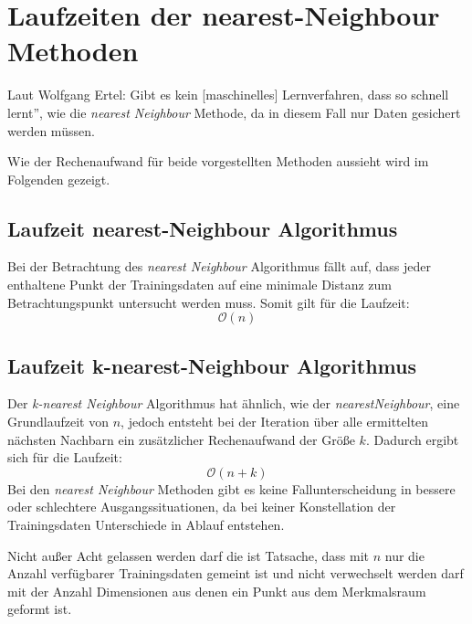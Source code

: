 \documentclass[fontsize=11pt]{scrartcl}
\begin{document}
                         
        \section{Laufzeiten der nearest-Neighbour Methoden}
        \label{sec:laufzeit}
            Laut Wolfgang Ertel: \glqq Gibt es kein [maschinelles] Lernverfahren, dass so schnell lernt”\cite{ertel2016_p213}, wie die \emph{nearest Neighbour} Methode, da in diesem Fall nur Daten gesichert werden müssen.\par
            Wie der Rechenaufwand für beide vorgestellten Methoden aussieht wird im Folgenden gezeigt.
                        
            \subsection{Laufzeit nearest-Neighbour Algorithmus}
                Bei der Betrachtung des \emph{nearest Neighbour} Algorithmus fällt auf, dass jeder enthaltene Punkt der Trainingsdaten auf eine minimale Distanz zum Betrachtungspunkt untersucht werden muss. Somit gilt für die Laufzeit:
                $$
                    \mathcal{O}(n)
                $$   
            
            \subsection{Laufzeit        k-nearest-Neighbour Algorithmus}
                Der \emph{k-nearest Neighbour} Algorithmus hat ähnlich, wie der \emph{nearestNeighbour}, eine Grundlaufzeit von $n$, jedoch entsteht bei der Iteration über alle ermittelten nächsten Nachbarn ein zusätzlicher Rechenaufwand der Größe $k$. Dadurch ergibt sich für die Laufzeit:
                $$
                    \mathcal{O}(n+k)
                $$
                Bei den \emph{nearest Neighbour} Methoden gibt es keine Fallunterscheidung in bessere oder schlechtere Ausgangssituationen, da bei keiner Konstellation der Trainingsdaten Unterschiede in Ablauf entstehen. \par
                Nicht außer Acht gelassen werden darf die ist Tatsache, dass mit $n$ nur die Anzahl verfügbarer Trainingsdaten gemeint ist und nicht verwechselt werden darf mit der Anzahl Dimensionen aus denen ein Punkt aus dem Merkmalsraum geformt ist.  


    \newpage

    
    
\end{document}
